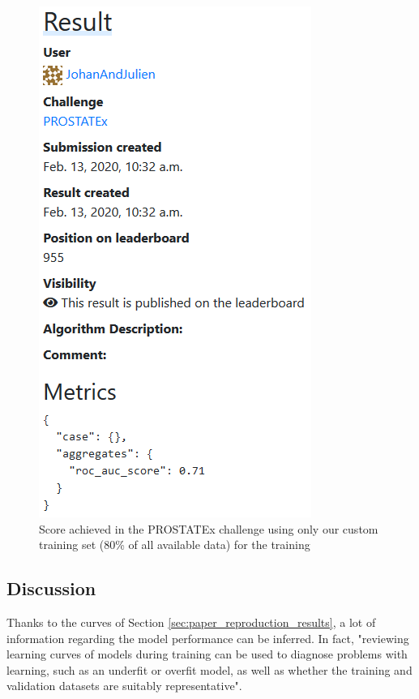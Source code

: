 \begin{figure}[!t]
\centering
\includegraphics[height=1\textwidth, keepaspectratio=true]{./figures/paper_reproduction_results_challenge1.png}
\caption{Score achieved in the PROSTATEx challenge using only our custom training set (80\% of all available data) for the training}
\label{fig:paper_reproduction_results_challenge_1}
\end{figure}


\subsection{Discussion}
\setlength{\marginparwidth}{3cm}\leavevmode {}Thanks to the curves of Section \ref{sec:paper_reproduction_results}, a lot of information regarding the model performance can be inferred. In fact, "reviewing learning curves of models during training can be used to diagnose problems with learning, such as an underfit or overfit model, as well as whether the training and validation datasets are suitably representative"\cite{40}.

